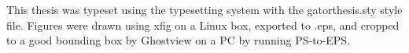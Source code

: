 %
%

\begin{colophon}
  This thesis was typeset using the \LaTeXe{} typesetting system with the
  gatorthesis.sty style file.  Figures were drawn using xfig on a Linux box,
exported to .eps, and cropped to a good bounding box by Ghostview on a PC by running
PS-to-EPS.

\end{colophon}
